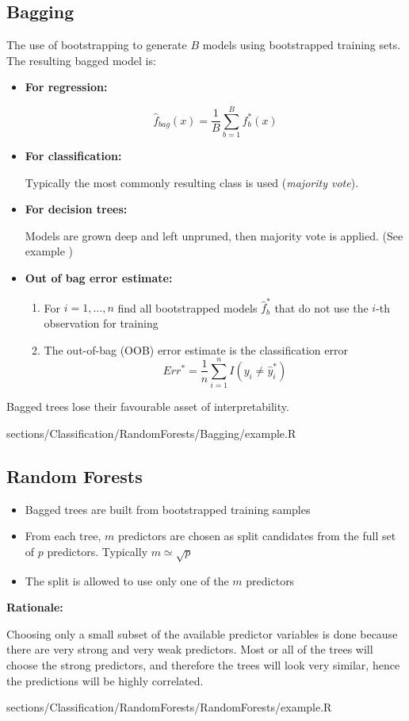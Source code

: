 \subsection{Bagging}
 	\RTheory
 	{
 		The use of bootstrapping to generate $B$ models using bootstrapped training sets. The resulting bagged model is:
 		
 		\begin{itemize}
 		    \item \textbf{For regression:}
 		    
 		    	$$ \hat{f}_{bag}(x) = \frac{1}{B} \sum\limits_{b=1}^B f_b^*(x)$$
 		    	
 		  	\item \textbf{For classification:}
 		  	
				Typically the most commonly resulting class is used (\emph{majority vote}).
 		  	
 		  	\item \textbf{For decision trees:}
 		  	
 	    		Models are grown deep and left unpruned, then majority vote is applied. (See example \textrightarrow)
 	    		
 	    	\item \textbf{Out of bag error estimate:}
 	    	
		 	    \begin{enumerate}
		 	        \item For $i = 1,\dots, n$ find all bootstrapped models $\hat{f}_b^*$ that do not use the $i$-th observation for training
		 	        \item The out-of-bag (OOB) error estimate is the classification error
		 	        	$$Err^* = \frac{1}{n} \sum\limits_{i=1}^nI(y_i \neq \hat{y}_i^*)$$ 
		 	    \end{enumerate}
 		\end{itemize}
 		
 		Bagged trees lose their favourable asset of interpretability.
	}
	{
		sections/Classification/RandomForests/Bagging/example.R
	}		
    	
\subsection{Random Forests}
	\RTheory
	{
		\begin{itemize}
	    	\item Bagged trees are built from bootstrapped training samples
	    	\item From each tree, $m$ predictors are chosen as split candidates from the full set of $p$ predictors. Typically $m \simeq \sqrt{p}$
	    	\item The split is allowed to use only one of the $m$ predictors
		\end{itemize}
		
		\textbf{Rationale:}
		
		Choosing only a small subset of the available predictor variables is done because there are very strong and very weak predictors. Most or all of the trees will choose the strong predictors, and therefore the trees will look very similar, hence the predictions will be highly correlated.
	}
	{
		sections/Classification/RandomForests/RandomForests/example.R
	}
	
